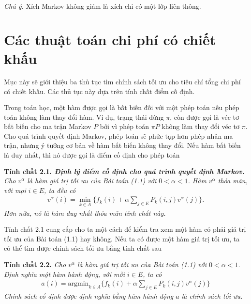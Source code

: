 \documentclass[12pt,a4paper]{report}
\begin{document}
   \textit{Chú ý.} Xích Markov không giảm là xích chỉ có một lớp liên thông.
  
	\chapter{Các thuật toán chi phí có chiết khấu}	
    Mục này sẽ giới thiệu ba thủ tục tìm chính sách tối ưu cho tiêu chí tổng chi phí có chiết khấu. Các thủ tục này dựa trên tính chất điểm cố định.
    
    Trong toán học, một hàm được gọi là bất biến đối với một phép toán nếu phép toán không làm thay đổi hàm. Ví dụ, trạng thái dừng $\pi$, còn được gọi là véc tơ bất biến cho ma trận Markov $P$ bởi vì phép toán $\pi P$ không làm thay đổi véc tơ $\pi$. Cho quá trình quyết định Markov, phép toán sẽ phức tạp hơn phép nhân ma trận, nhưng ý tưởng cơ bản về hàm bất biến không thay đổi. Nếu hàm bất biến là duy nhất, thì nó được gọi là điểm cố định cho phép toán 
    
    \medskip
    \begin{shaded*}
    	\noindent
     \noindent
    \textbf{Tính chất 2.1. \textit{Định lý điểm cố định cho quá trình quyết định Markov.}}\textit{ Cho $v^\alpha$ là hàm giá trị tối ưu của Bài toán (1.1) với $0<\alpha<1$. Hàm $v^\alpha$ thỏa mãn, với mọi $i \in E$, ta đều có
    	\begin{align}
    	v^\alpha (i)=\underset{k \in A} {\min }\{f_k(i)+\alpha \sum_{j \in E}P_k(i,j)v^\alpha(j)\} .
    	\end{align} 
    	Hơn nữa, nó là hàm duy nhất thỏa mãn tính chất này.}
    \end{shaded*}
   
    
    \medskip
    Tính chất 2.1 cung cấp cho ta một cách để kiểm tra xem một hàm có phải giá trị tối ưu của Bài toán (1.1) hay không. Nếu ta có được một hàm giá trị tối ưu, ta có thể tìm được chính sách tối ưu bằng tính chất sau
    
    
    \medskip
    \begin{shaded*}
    \noindent
   \textbf{Tính chất 2.2.} \textit {Cho $v^\alpha$ là hàm giá trị tối ưu của Bài toán (1.1) với $0<\alpha<1$. Định nghĩa một hàm hành động, với mỗi $i\in E$, ta có
   	\begin{align}
   	a(i)=\mathrm{argmin}_{k\in A}\{f_k(i)+\alpha \sum_{j \in E}P_k(i,j)v^\alpha(j)\}
   	\end{align}
   	Chính sách cố định được định nghĩa bằng hàm hành động $a$ là chính sách tối ưu.}
    \end{shaded*}
   
\end{document}
